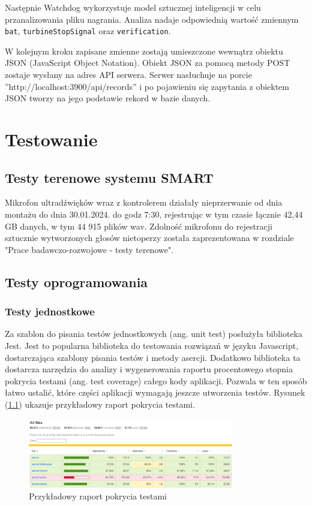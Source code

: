 \documentclass{sprz}
\begin{document}
Następnie Watchdog wykorzystuje model sztucznej inteligencji w celu przanalizowania pliku nagrania. Analiza nadaje odpowiednią wartość zmiennym \verb|bat|, \verb|turbineStopSignal| oraz \verb|verification|.

W kolejnym kroku zapisane zmienne zostają umieszczone wewnątrz obiektu JSON (JavaScript Object Notation). Obiekt JSON za pomocą metody POST zostaje wysłany na adres API serwera. Serwer nasłuchuje na porcie ”http://localhost:3900/api/records” i po pojawieniu się zapytania z obiektem JSON tworzy na jego podstawie rekord w bazie danych.

\chapter{Testowanie}

\section{Testy terenowe systemu SMART}
Mikrofon ultradźwięków wraz z kontrolerem działały nieprzerwanie od dnia montażu do dnia 30.01.2024. do godz 7:30, rejestrując w tym czasie łącznie 42,44 GB danych, w tym 44 915 plików wav.
Zdolność mikrofonu do rejestracji sztucznie wytworzonych głosów nietoperzy została zaprezentowana w rozdziale "Prace badawczo-rozwojowe - testy terenowe".

\section{Testy oprogramowania}

\subsection{Testy jednostkowe}

Za szablon do pisania testów jednostkowych (ang. unit test) posłużyła biblioteka Jest. Jest to popularna biblioteka do testowania rozwiązań w języku Javascript, dostarczająca szablony pisania testów i metody asercji. Dodatkowo biblioteka ta dostarcza narzędzia do analizy i wygenerowania raportu procentowego stopnia pokrycia testami (ang. test coverage) całego kody aplikacji. Pozwala w ten sposób łatwo ustalić, które części aplikacji wymagają jeszcze utworzenia testów. Rysunek (\ref{img:test_coverage}) ukazuje przykładowy raport pokrycia testami.

\begin{figure}[h]
  \centering
  \includegraphics[width=0.8\textwidth]{sprz/test_coverage}
  \caption{Przykładowy raport pokrycia testami}
  \label{img:test_coverage}
\end{figure}
\end{document}
